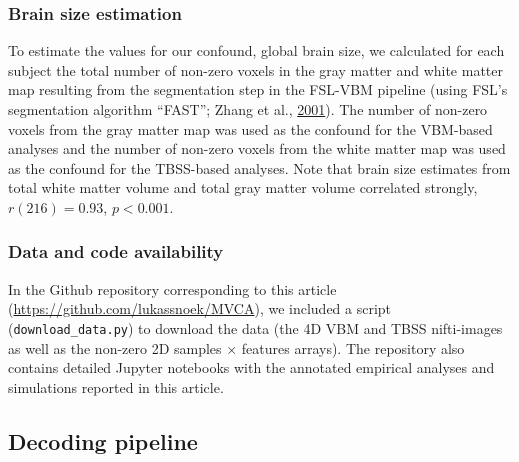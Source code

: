 \documentclass[12pt,american,a4paper,oneside,]{memoir} %
\begin{document}
\hypertarget{confounds-decoding-methods-data-brainsize}{%
\subsubsection{Brain size estimation}\label{confounds-decoding-methods-data-brainsize}}

To estimate the values for our confound, global brain size, we calculated for each subject the total number of non-zero voxels in the gray matter and white matter map resulting from the segmentation step in the FSL-VBM pipeline (using FSL's segmentation algorithm ``FAST''; Zhang et al., \protect\hyperlink{ref-Zhang2001-wa}{2001}). The number of non-zero voxels from the gray matter map was used as the confound for the VBM-based analyses and the number of non-zero voxels from the white matter map was used as the confound for the TBSS-based analyses. Note that brain size estimates from total white matter volume and total gray matter volume correlated strongly, \(r (216) = 0.93\), \(p < 0.001\).

\hypertarget{confounds-decoding-methods-data-data-and-code}{%
\subsubsection{Data and code availability}\label{confounds-decoding-methods-data-data-and-code}}

In the Github repository corresponding to this article (\url{https://github.com/lukassnoek/MVCA}), we included a script (\texttt{download\_data.py}) to download the data (the 4D VBM and TBSS nifti-images as well as the non-zero 2D samples × features arrays). The repository also contains detailed Jupyter notebooks with the annotated empirical analyses and simulations reported in this article.

\hypertarget{confounds-decoding-methods-pipeline}{%
\subsection{Decoding pipeline}\label{confounds-decoding-methods-pipeline}}
\end{document}
